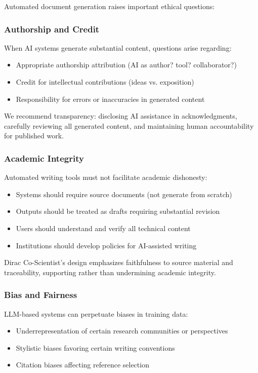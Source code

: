 \documentclass{ieeeaccess}
\begin{document}
Automated document generation raises important ethical questions:

\subsubsection{Authorship and Credit}

When AI systems generate substantial content, questions arise regarding:
\begin{itemize}
\item Appropriate authorship attribution (AI as author? tool? collaborator?)
\item Credit for intellectual contributions (ideas vs. exposition)
\item Responsibility for errors or inaccuracies in generated content
\end{itemize}

We recommend transparency: disclosing AI assistance in acknowledgments, carefully reviewing all generated content, and maintaining human accountability for published work.

\subsubsection{Academic Integrity}

Automated writing tools must not facilitate academic dishonesty:
\begin{itemize}
\item Systems should require source documents (not generate from scratch)
\item Outputs should be treated as drafts requiring substantial revision
\item Users should understand and verify all technical content
\item Institutions should develop policies for AI-assisted writing
\end{itemize}

Dirac Co-Scientist's design emphasizes faithfulness to source material and traceability, supporting rather than undermining academic integrity.

\subsubsection{Bias and Fairness}

LLM-based systems can perpetuate biases in training data:
\begin{itemize}
\item Underrepresentation of certain research communities or perspectives
\item Stylistic biases favoring certain writing conventions
\item Citation biases affecting reference selection
\end{itemize}
\end{document}
